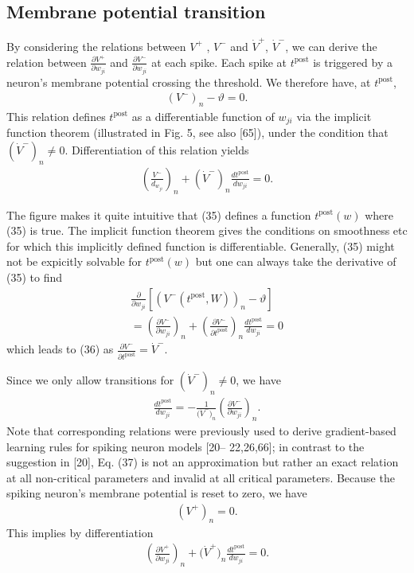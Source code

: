 \documentclass[a4paper]{article}
\newcommand{\blue}[1]{{\color{blue}#1}}
\begin{document}
  \blue{
\subsection{
  Membrane potential transition}
By considering the relations between
  $V^+$ , $V^-$ and $\dot{V}^+$, $\dot{V}^-$, we can derive the
  relation between $\frac{\partial V^+}{\partial
    w_{ji}}$ and $\frac{\partial V^-}{\partial w_{ji}}$ at each spike.
  Each spike at $t^{\text{post}}$ is triggered by a neuron's membrane potential
  crossing the threshold. We therefore have, at $t^{\text{post}}$,
  \begin{align}
    (V^-)_n - \vartheta = 0. \tag{35}
  \end{align}
  This relation defines $t^{\text{post}}$ as a differentiable function of $w_{ji}$ via the implicit function theorem (illustrated in
Fig. 5, see also [65]),  under the condition that $(\dot{V}^−)_n \neq
0$. Differentiation of this relation yields
\begin{align}
  \left(\frac{V^-}{d_{w_{ji}}}\right)_n + \left(\dot{V}^-\right)_n
\frac{d t^{\text{post}}}{d w_{ji}} = 0. \tag{36}
\end{align}
  }

The figure makes it quite intuitive that \blue{(35)} defines a
function $t^{\text{post}} (w)$ where \blue{(35)} is true. The implicit
function theorem gives the conditions on smoothness etc for which this
implicitly defined function is differentiable. Generally, \blue{(35)}
might not be expicitly solvable for $t^{\text{post}} (w)$ but one can
always take the derivative of  \blue{(35)} to find
\begin{align}
  \frac{\partial}{\partial w_{ji}} \left[(V^-(t^{\text{post}},W))_n -
    \vartheta\right] \\
 = \left(\frac{\partial V^-}{\partial w_{ji}}\right)_n + \left(\frac{\partial
    V^-}{\partial t^{\text{post}}}\right)_n \frac{d t^{\text{post}}}{d
    w_{ji}} = 0
\end{align}
which leads to \blue{(36)} as $\frac{\partial V^-}{\partial t^{\text{post}}} = \dot{V}^-$.

\blue{
  Since we only allow transitions for $(\dot{V}^−)_n \neq 0$, we have
  \begin{align}
    \frac{dt^{\text{post}}}{d w_{ji}} = -
      \frac{1}{\big(\dot{V}^-\big)_n} \left(\frac{\partial
        V^-}{\partial w_{ji}} \right)_n . \tag{37}
  \end{align}
  Note that corresponding relations were previously used to derive
  gradient-based learning rules for spiking neuron models [20–
    22,26,66]; in contrast to the suggestion in [20], Eq. (37) is not
  an approximation but rather an exact relation at all non-critical
  parameters and invalid at all critical parameters.  Because the
  spiking neuron’s membrane potential is reset to zero, we have
  \begin{align}
    \left(V^{+}\right)_n = 0. \tag{38}
  \end{align}
  This implies by differentiation
  \begin{align}
    \left(\frac{\partial V^+}{\partial w_{ji}}\right)_n +
    \big(\dot{V}^+\big)_n \frac{d t^{\text{post}}}{d w_{ji}} =
    0. \tag{39}
  \end{align}
}
\end{document}
